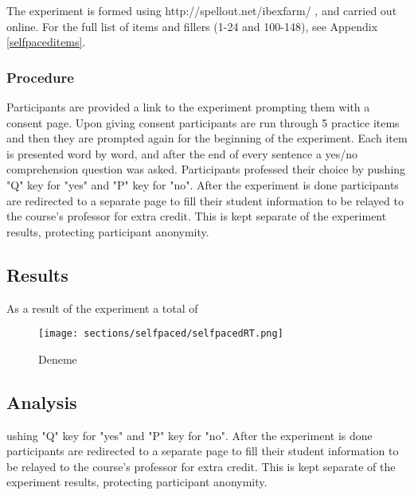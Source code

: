 The experiment is formed using http://spellout.net/ibexfarm/ \citep{drummond2013ibex}, and carried out online. For the full list of items and fillers (1-24 and 100-148), see Appendix \ref{selfpaceditems}.

\subsubsection{Procedure}
Participants are provided a link to the experiment prompting them with a consent page. Upon giving consent participants are run through 5 practice items and then they are prompted again for the beginning of the experiment. Each item is presented word by word, and after the end of every sentence a yes/no comprehension question was asked. Participants professed their choice by pushing "Q" key for "yes" and "P" key for "no". After the experiment is done participants are redirected to a separate page to fill their student information to be relayed to the course's professor for extra credit. This is kept separate of the experiment results, protecting participant anonymity.



\subsection{Results}
As a result of the experiment a total of 

\begin{figure}[hbt!]
    \centering
    \texttt{[image: sections/selfpaced/selfpacedRT.png]}
    \caption{Deneme}
    \label{fig:selfpacedrt}
\end{figure}


\subsection{Analysis}
ushing "Q" key for "yes" and "P" key for "no". After the experiment is done participants are redirected to a separate page to fill their student information to be relayed to the course's professor for extra credit. This is kept separate of the experiment results, protecting participant anonymity.